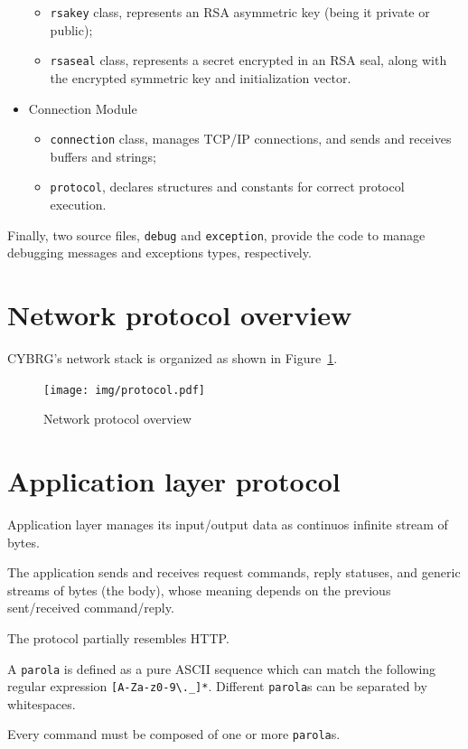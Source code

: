 \documentclass[a4paper,12pt]{article}
\newcommand{\projectname}{CYBRG}
\begin{document}
\begin{itemize}
\begin{itemize}
    \item \texttt{rsakey} class, represents an RSA asymmetric key (being it private or public);
    \item \texttt{rsaseal} class, represents a secret encrypted in an RSA seal, along with the encrypted symmetric key and initialization vector.
  \end{itemize}
  \item Connection Module
  \begin{itemize}
    \item \texttt{connection} class, manages TCP/IP connections, and sends and receives buffers and strings;
    \item \texttt{protocol}, declares structures and constants for correct protocol execution.
  \end{itemize}
\end{itemize}

Finally, two source files, \texttt{debug} and \texttt{exception}, provide the code to manage debugging messages and exceptions types, respectively.

\section{Network protocol overview}
\projectname{}'s network stack is organized as shown in Figure~\ref{img:protocol}.

\begin{figure}[H]
  \centering
  \texttt{[image: img/protocol.pdf]}
  \caption{Network protocol overview}
  \label{img:protocol}
\end{figure}

\section{Application layer protocol}
Application layer manages its input/output data as continuos infinite stream of bytes.

The application sends and receives request commands, reply statuses, and generic streams of bytes (the body), whose meaning depends on the previous sent/received command/reply.

The protocol partially resembles HTTP.

A \texttt{parola} is defined as a pure ASCII sequence which can match the following regular expression \texttt{[A-Za-z0-9\textbackslash.\_]*}.
Different \texttt{parola}s can be separated by whitespaces.

Every command must be composed of one or more \texttt{parola}s.
\end{document}
